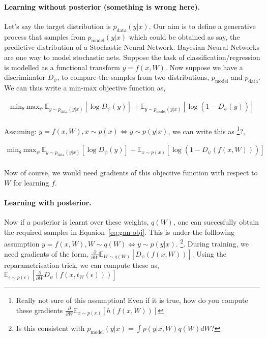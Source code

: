 \documentclass[twoside]{article}
\begin{document}
\paragraph{Learning without posterior (something is wrong here). }
Let's say the target distribution is $p_{\text{data}}(y|x)$. Our aim is to define a generative process that samples from $p_{\text{model}}(y|x)$ which could be obtained as say, the predictive distribution of a Stochastic Neural Network. Bayesian Neural Networks are one way to model stochastic nets. Suppose the task of classification/regression is modelled as a functional transform $y=f(x,W)$. Now suppose we have a discriminator $D_\psi$, to compare the samples from two distributions, $p_{\text{model}}$ and $p_{\text{data}}$. We can thus write a min-max objective function as,

\begin{align}
\text{min}_\theta\ \text{max}_\psi\ \mathbb{E}_{y\sim p_{\text{data}}(y|x)}[\log D_\psi(y)] + \mathbb{E}_{y\sim p_{\text{model}}(y|x)}[\log \left( 1-D_\psi(y) \right) ]\\
\end{align}

Assuming: $y = f(x,W), x \sim p(x) \iff y \sim p(y|x)$, we can write this as \footnote{Really not sure of this assumption! Even if it is true, how do you compute these gradients $\frac{\partial}{\partial W} \mathbb{E}_{x\sim p(x)}[h(f(x,W))]$}?,

\begin{align}
\text{min}_\theta\ \text{max}_\psi\ \mathbb{E}_{y\sim p_{\text{data}}(y|x)}[\log D_\psi(y)] + \mathbb{E}_{x\sim p(x)}[\log \left( 1-D_\psi(f(x,W)) \right) ]\\
\end{align}

Now of course, we would need gradients of this objective function with respect to $W$ for learning $f$. 

\paragraph{Learning with posterior. }
Now if a posterior is learnt over these weights, $q(W)$, one can succesfully obtain the required samples in Equaion~\eqref{eq:gan-obj}. This is under the folllowing assumption $y = f(x,W), W \sim q(W) \iff y \sim p(y|x)$. \footnote{Is this consistent with $p_{\text{model}}(y|x) = \int p(y|x,W)q(W) dW$?}. During training, we need gradients of the form, $\frac{\partial}{\partial W} \mathbb{E}_{W\sim q(W)}[D_\psi(f(x,W))]$. Using the reparametrisation trick, we can compute these as, $\mathbb{E}_{\epsilon \sim p(\epsilon)}\left[\frac{\partial}{\partial W} D_\psi(f(x,t_W(\epsilon)))\right]$
\end{document}
